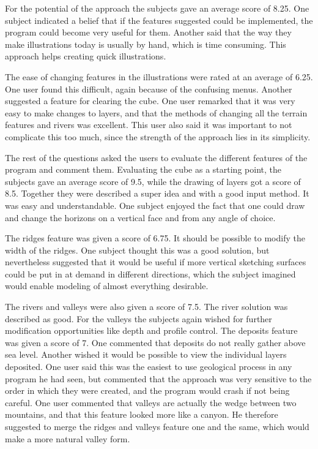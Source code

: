 \documentclass[a4paper,12pt]{report}
\begin{document}
For the potential of the approach the subjects gave an average score of 8.25. One subject indicated a belief that if the features suggested could be implemented, the program could become very useful for them. Another said that the way they make illustrations today is usually by hand, which is time consuming. This approach helps creating quick illustrations.

The ease of changing features in the illustrations were rated at an average of 6.25. One user found this difficult, again because of the confusing menus. Another suggested a feature for clearing the cube. One user remarked that it was very easy to make changes to layers, and that the methods of changing all the terrain features and rivers was excellent. This user also said it was important to not complicate this too much, since the strength of the approach lies in its simplicity.

The rest of the questions asked the users to evaluate the different features of the program and comment them. Evaluating the cube as a starting point, the subjects gave an average score of 9.5, while the drawing of layers got a score of 8.5. Together they were described a super idea and with a good input method. It was easy and understandable. One subject enjoyed the fact that one could draw and change the horizons on a vertical face and from any angle of choice.

The ridges feature was given a score of 6.75. It should be possible to modify the width of the ridges. One subject thought this was a good solution, but nevertheless suggested that it would be useful if more vertical sketching surfaces could be put in at demand in different directions, which the subject imagined would enable modeling of almost everything desirable.

The rivers and valleys were also given a score of 7.5. The river solution was described as good. For the valleys the subjects again wished for further modification opportunities like depth and profile control. The deposits feature was given a score of 7. One commented that deposits do not really gather above sea level. Another wished it would be possible to view the individual layers deposited. One user said this was the easiest to use geological process in any program he had seen, but commented that the approach was very sensitive to the order in which they were created, and the program would crash if not being careful. One user commented that valleys are actually the wedge between two mountains, and that this feature looked more like a canyon. He therefore suggested to merge the ridges and valleys feature one and the same, which would make a more natural valley form.
\end{document}
